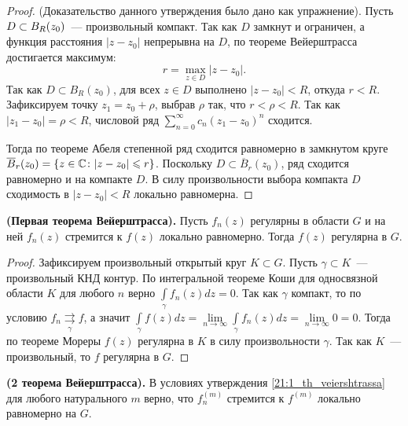 \begin{proof}
    (Доказательство данного утверждения было дано как упражнение). Пусть \(D
    \hm\subset B_R(z_0)\)~--- произвольный компакт. Так как \(D\) замкнут и ограничен, а функция
    расстояния \(|z - z_0|\) непрерывна на \(D\), по теореме Вейерштрасса достигается максимум:
    \[
        r = \max\limits_{z \in D} |z - z_0|.
    \]
    Так как \(D \subset B_R(z_0)\), для всех \(z \in D\) выполнено \(|z - z_0| < R\), откуда
    \(r < R\). Зафиксируем точку \(z_1 = z_0 + \rho\), выбрав \(\rho\) так, что \(r < \rho < R\).
    Так как \(|z_1 - z_0| = \rho < R\), числовой ряд \(\sum\limits_{n=0}^\infty c_n (z_1 - z_0)^n\)
    сходится.

    Тогда по теореме Абеля степенной ряд сходится равномерно в замкнутом круге
    \(\overline{B}_r(z_0) = \{z \in \mathbb{C} \colon |z - z_0| \leqslant r\}\). Поскольку \(D \subset
    \overline{B}_r(z_0)\), ряд сходится равномерно и на компакте \(D\). В силу произвольности выбора
    компакта \(D\) сходимость в \(|z - z_0| < R\) локально равномерна.
\end{proof}

\begin{statement}\label{21:1_th_veiershtrassa}
    \textbf{(Первая теорема Вейерштрасса).} Пусть \(f_n(z)\) регулярны в области \(G\) и на ней
    \(f_n(z)\) стремится к \(f(z)\) локально равномерно. Тогда \(f(z)\) регулярна в \(G\).
\end{statement}

\begin{proof}
    Зафиксируем произвольный открытый круг \(K \subset G\). Пусть \(\gamma \subset K\)~---
    произвольный КНД контур. По интегральной теореме Коши для односвязной области \(K\) для любого
    \(n\) верно \(\int\limits_\gamma f_n(z) dz = 0\). Так как \(\gamma\) компакт, то по условию
    \(f_n \mathrel{\mathop{\rightrightarrows}\limits_{\gamma}} f\), а значит \(\int\limits_\gamma
    f(z) dz = \lim\limits_{n \rightarrow \infty} \int\limits_\gamma f_n(z) dz =
    \lim\limits_{n \rightarrow \infty} 0 = 0\). Тогда по теореме Мореры \(f(z)\) регулярна в \(K\) в
    силу произвольности \(\gamma\). Так как \(K\)~--- произвольный, то \(f\) регулярна в \(G\).
\end{proof}

\begin{statement}
    \textbf{(2 теорема Вейерштрасса).} В условиях утверждения \ref{21:1_th_veiershtrassa} для
    любого натурального \(m\) верно, что \(f_n^{(m)}\) стремится к \(f^{(m)}\) локально равномерно
    на \(G\).
\end{statement}

